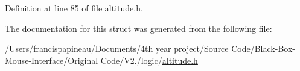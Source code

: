 \-Definition at line 85 of file altitude.\-h.



\-The documentation for this struct was generated from the following file\-:\begin{DoxyCompactItemize}
\item 
/\-Users/francispapineau/\-Documents/4th year project/\-Source Code/\-Black-\/\-Box-\/\-Mouse-\/\-Interface/\-Original Code/\-V2./logic/\hyperlink{altitude_8h}{altitude.\-h}\end{DoxyCompactItemize}
